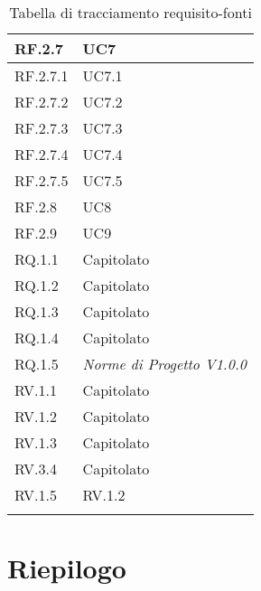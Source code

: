 \begin{center}
\begin{longtable}{|C{6cm}|C{6cm}|}
    RF.2.7 & UC7 \\ \hline
    RF.2.7.1 & UC7.1 \\ \hline
    RF.2.7.2 & UC7.2 \\ \hline
    RF.2.7.3 & UC7.3 \\ \hline
    RF.2.7.4 & UC7.4 \\ \hline
    RF.2.7.5 & UC7.5 \\ \hline
    RF.2.8 & UC8 \\ \hline
    RF.2.9 & UC9 \\ \hline
    RQ.1.1 & Capitolato \\ \hline
    RQ.1.2 & Capitolato \\ \hline
    RQ.1.3 & Capitolato \\ \hline
    RQ.1.4 & Capitolato \\ \hline
    RQ.1.5 & \textit{Norme di Progetto V1.0.0} \\ \hline
    RV.1.1 & Capitolato \\ \hline
    RV.1.2 & Capitolato \\ \hline
    RV.1.3 & Capitolato \\ \hline
    RV.3.4 & Capitolato \\ \hline
    RV.1.5 & RV.1.2 \\ \hline

    \caption{Tabella di tracciamento requisito-fonti}
  \end{longtable}
\end{center}


\section{Riepilogo}

